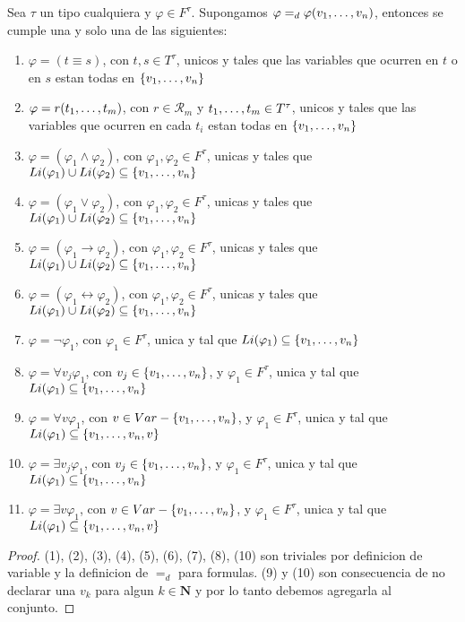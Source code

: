 \begin{lemma}
  Sea $\tau$ un tipo cualquiera y $\varphi \in F^\tau$. Supongamos $\varphi =_d \varphi(v_{1}, \dots, v_{n})$, entonces 
  se cumple una y solo una de las siguientes: \begin{enumerate}
    \item $\varphi = (t\equiv s)$, con $t, s \in T^\tau$, unicos y tales que las variables que ocurren en $t$ o en $s$ estan todas en $\{v_{1}, \dots, v_{n}\}$
    \item $\varphi = r(t_{1}, \dots, t_{m})$, con $r \in \mathcal{R}_m$ y $t_{1}, \dots, t_{m} \in T^\tau$, unicos y tales que las variables que ocurren en cada $t_i$ estan todas en $\{v_{1}, \dots, v_{n}\}$
    \item $\varphi = (\varphi_1 \land \varphi_2)$, con $\varphi_1, \varphi_2 \in F^\tau$, unicas y tales que $Li(\varphi_1)\cup Li(\varphi_2) \subseteq \{v_{1}, \dots, v_{n}\}$
    \item $\varphi = (\varphi_1 \lor \varphi_2)$, con $\varphi_1, \varphi_2 \in F^\tau$, unicas y tales que $Li(\varphi_1)\cup Li(\varphi_2) \subseteq \{v_{1}, \dots, v_{n}\}$
    \item $\varphi = (\varphi_1 \rightarrow \varphi_2)$, con $\varphi_1, \varphi_2 \in F^\tau$, unicas y tales que $Li(\varphi_1)\cup Li(\varphi_2) \subseteq \{v_{1}, \dots, v_{n}\}$
    \item $\varphi = (\varphi_1 \leftrightarrow \varphi_2)$, con $\varphi_1, \varphi_2 \in F^\tau$, unicas y tales que $Li(\varphi_1)\cup Li(\varphi_2) \subseteq \{v_{1}, \dots, v_{n}\}$
    \item $\varphi = \neg\varphi_1$, con $\varphi_1 \in F^\tau$, unica y tal que $Li(\varphi_1) \subseteq \{v_{1}, \dots, v_{n}\}$
    \item $\varphi = \forall v_j\varphi_1$, con $v_j \in \{v_{1}, \dots, v_{n}\}$, y $\varphi_1 \in F^\tau$, unica y tal que $Li(\varphi_1) \subseteq \{v_{1}, \dots, v_{n}\}$
    \item $\varphi = \forall v\varphi_1$, con $v \in Var - \{v_{1}, \dots, v_{n}\}$, y $\varphi_1 \in F^\tau$, unica y tal que $Li(\varphi_1) \subseteq \{v_{1}, \dots, v_{n}, v\}$
    \item $\varphi = \exists v_j\varphi_1$, con $v_j \in \{v_{1}, \dots, v_{n}\}$, y $\varphi_1 \in F^\tau$, unica y tal que $Li(\varphi_1) \subseteq \{v_{1}, \dots, v_{n}\}$
    \item $\varphi = \exists v\varphi_1$, con $v \in Var - \{v_{1}, \dots, v_{n}\}$, y $\varphi_1 \in F^\tau$, unica y tal que $Li(\varphi_1) \subseteq \{v_{1}, \dots, v_{n}, v\}$
  \end{enumerate}
\end{lemma}
\begin{proof}
  (1), (2), (3), (4), (5), (6), (7), (8), (10) son triviales por definicion de variable y la definicion de $=_d$ para formulas.
  (9) y (10) son consecuencia de no declarar una $v_k$ para algun $k\in \mathbf{N}$ y por lo tanto debemos agregarla al conjunto.
\end{proof}

